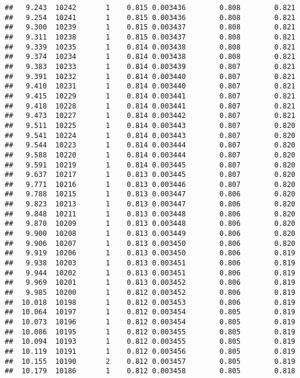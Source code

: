 \documentclass[
]{book}
\begin{document}
\begin{verbatim}
##   9.243  10242       1    0.815 0.003436        0.808        0.821
##   9.254  10241       1    0.815 0.003436        0.808        0.821
##   9.300  10239       1    0.815 0.003437        0.808        0.821
##   9.311  10238       1    0.815 0.003437        0.808        0.821
##   9.339  10235       1    0.814 0.003438        0.808        0.821
##   9.374  10234       1    0.814 0.003438        0.808        0.821
##   9.383  10233       1    0.814 0.003439        0.807        0.821
##   9.391  10232       1    0.814 0.003440        0.807        0.821
##   9.410  10231       1    0.814 0.003440        0.807        0.821
##   9.415  10229       1    0.814 0.003441        0.807        0.821
##   9.418  10228       1    0.814 0.003441        0.807        0.821
##   9.473  10227       1    0.814 0.003442        0.807        0.821
##   9.511  10225       1    0.814 0.003443        0.807        0.820
##   9.541  10224       1    0.814 0.003443        0.807        0.820
##   9.544  10223       1    0.814 0.003444        0.807        0.820
##   9.588  10220       1    0.814 0.003444        0.807        0.820
##   9.591  10219       1    0.814 0.003445        0.807        0.820
##   9.637  10217       1    0.813 0.003445        0.807        0.820
##   9.771  10216       1    0.813 0.003446        0.807        0.820
##   9.788  10215       1    0.813 0.003447        0.806        0.820
##   9.823  10213       1    0.813 0.003447        0.806        0.820
##   9.848  10211       1    0.813 0.003448        0.806        0.820
##   9.870  10209       1    0.813 0.003448        0.806        0.820
##   9.900  10208       1    0.813 0.003449        0.806        0.820
##   9.906  10207       1    0.813 0.003450        0.806        0.820
##   9.919  10206       1    0.813 0.003450        0.806        0.819
##   9.938  10203       1    0.813 0.003451        0.806        0.819
##   9.944  10202       1    0.813 0.003451        0.806        0.819
##   9.969  10201       1    0.813 0.003452        0.806        0.819
##   9.985  10200       1    0.812 0.003452        0.806        0.819
##  10.018  10198       1    0.812 0.003453        0.806        0.819
##  10.064  10197       1    0.812 0.003454        0.805        0.819
##  10.073  10196       1    0.812 0.003454        0.805        0.819
##  10.086  10195       1    0.812 0.003455        0.805        0.819
##  10.094  10193       1    0.812 0.003455        0.805        0.819
##  10.119  10191       1    0.812 0.003456        0.805        0.819
##  10.155  10190       2    0.812 0.003457        0.805        0.819
##  10.179  10186       1    0.812 0.003458        0.805        0.818

\end{verbatim}
\end{document}
